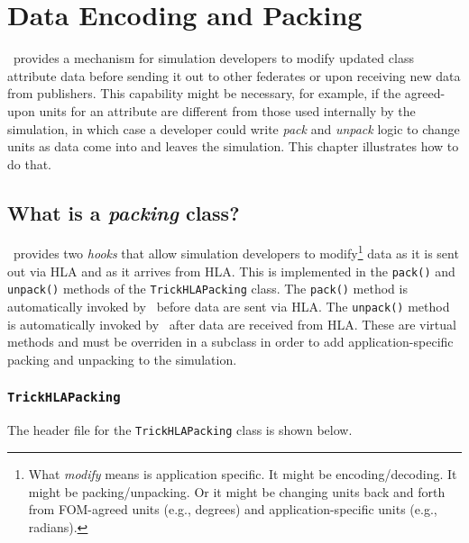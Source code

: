 \chapter{Data Encoding and Packing}
\label{sec:hla-pack}

\TrickHLA\ provides a mechanism for simulation developers to
modify updated class attribute data before sending it out to other federates
or upon receiving new data from publishers.
This capability might be necessary, for example, if the agreed-upon units
for an attribute are different from those used internally by the simulation,
in which case a developer could write {\em pack} and {\em unpack} logic
to change units as data come into and leaves the simulation.
This chapter illustrates how to do that.

\section{What is a {\em packing} class?}

\TrickHLA\ provides two {\em hooks} that allow simulation developers
to modify\footnote{
  What {\em modify} means is application specific.
  It might be encoding/decoding.
  It might be packing/unpacking.
  Or it might be changing units back and forth from FOM-agreed units
  (e.g., degrees) and application-specific units (e.g., radians).
}
data as it is sent out via HLA
and as it arrives from HLA.
This is implemented in the {\tt pack()} and {\tt unpack()}
methods of the {\tt TrickHLAPacking} class.
The {\tt pack()} method is automatically invoked by
\TrickHLA\ before data are sent via HLA.
The {\tt unpack()} method is automatically invoked by
\TrickHLA\ after data are received from HLA.
These are virtual methods and must be overriden in a subclass
in order to add application-specific packing and unpacking to the simulation.

\subsection{{\tt TrickHLAPacking}}

The header file for the {\tt TrickHLAPacking} class is shown below.

